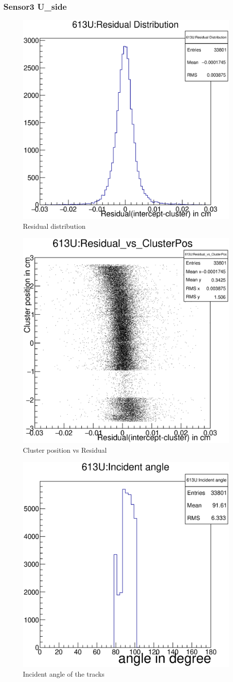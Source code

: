 \documentclass[12pt]{article}
\begin{document}
	\subsubsection{Sensor3 U\_side}
	\begin{multicols}{3}
		
		\begin{figure}[H]
			\includegraphics[width=.3\textwidth]{613U:residualplot.eps}	
			\caption{Residual distribution}	
			\label{fig1}	
		\end{figure}
		\begin{figure}[H]
			\includegraphics[width=.3\textwidth]{613U:residual_vs_clusterpos.eps}	
			\caption{Cluster position vs Residual}	
			\label{fig2}	
		\end{figure}
		\begin{figure}[H]
			\includegraphics[width=.3\textwidth]{613U:incident_angle.eps}	
			\caption{Incident angle of the tracks}	
			\label{fig2}	
		\end{figure}
	\end{multicols}
	
\end{document}
